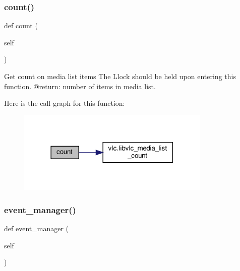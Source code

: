 \subsubsection{\texorpdfstring{count()}{count()}}
{\footnotesize\ttfamily def count (\begin{DoxyParamCaption}\item[{}]{self }\end{DoxyParamCaption})}

\begin{DoxyVerb}Get count on media list items
The L{lock} should be held upon entering this function.
@return: number of items in media list.
\end{DoxyVerb}
 Here is the call graph for this function\+:
\nopagebreak
\begin{figure}[H]
\begin{center}
\leavevmode
\includegraphics[width=261pt]{classvlc_1_1_media_list_a5eb880efb244834d39c062297388252b_cgraph}
\end{center}
\end{figure}
\mbox{\label{classvlc_1_1_media_list_ab7c92812cd259eb8e4e4fd292b81bfaa}} 
\subsubsection{\texorpdfstring{event\+\_\+manager()}{event\_manager()}}
{\footnotesize\ttfamily def event\+\_\+manager (\begin{DoxyParamCaption}\item[{}]{self }\end{DoxyParamCaption})}

